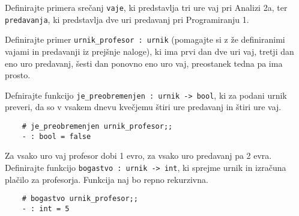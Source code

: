\documentclass[arhiv]{../izpit}
\begin{document}
	\podnaloga Definirajte primera srečanj \verb|vaje|, ki predstavlja tri ure vaj pri Analizi 2a, ter \verb|predavanja|, ki predstavlja dve uri predavanj pri Programiranju 1.
	
	\podnaloga Definirajte primer \verb|urnik_profesor : urnik| (pomagajte si z že definiranimi vajami in predavanji iz prejšnje naloge), ki ima prvi dan dve uri vaj, tretji dan eno uro predavanj, šesti dan ponovno eno uro vaj, preostanek tedna pa ima prosto.
	
	\podnaloga Defnirajte funkcijo \verb|je_preobremenjen : urnik -> bool|, ki za podani urnik preveri, da so v vsakem dnevu kvečjemu štiri ure predavanj in štiri ure vaj.
	
	\begin{verbatim}
	# je_preobremenjen urnik_profesor;;
	- : bool = false
	\end{verbatim}
	
	\podnaloga Za vsako uro vaj profesor dobi 1 evro, za vsako uro predavanj pa 2 evra. Definirajte funkcijo \verb|bogastvo : urnik -> int|, ki sprejme urnik in izračuna plačilo za profesorja. Funkcija naj bo repno rekurzivna.
	
	\begin{verbatim}
	# bogastvo urnik_profesor;;
	- : int = 5
	\end{verbatim}
	
	
\end{document}

